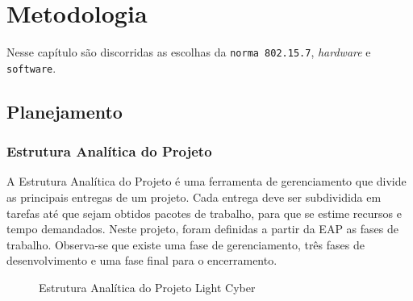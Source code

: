 	\chapter{Metodologia}\label{cap-metodologia}
	
	Nesse capítulo são discorridas as escolhas da \texttt{norma 802.15.7}, \textit{hardware} e \texttt{software}.
	
	\section{Planejamento}\label{sec-planejamento}
	
	\subsection{Estrutura Analítica do Projeto}\label{subsec-eap}
	
	A Estrutura Analítica do Projeto é uma ferramenta de gerenciamento que divide as principais entregas de um projeto. Cada entrega deve ser subdividida em tarefas até que sejam obtidos pacotes de trabalho, para que se estime recursos e tempo demandados. Neste projeto, foram definidas a partir da EAP as fases de trabalho. Observa-se que existe uma fase de gerenciamento, três fases de desenvolvimento e uma fase final para o encerramento.
	
	
	\begin{figure}[h!]
		\caption{\label{fig_eap} Estrutura Analítica do Projeto Light Cyber }
		\centering
	\end{figure}
	
